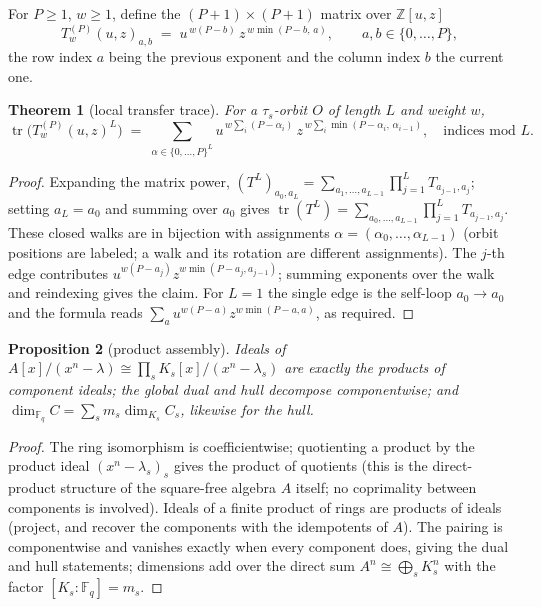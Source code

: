\documentclass[11pt]{article}
\newtheorem{theorem}{Theorem}[section]
\newtheorem{proposition}[theorem]{Proposition}
\theoremstyle{definition}
\theoremstyle{remark}
\newcommand{\Fq}{\mathbb{F}_q}
\newcommand{\Z}{\mathbb{Z}}
\newcommand{\tr}{\operatorname{tr}}
\begin{document}
For \(P \ge 1\), \(w \ge 1\), define the \((P{+}1)\times(P{+}1)\) matrix
over \(\Z[u,z]\)
\[
T^{(P)}_w(u,z)_{a,b} \;=\; u^{\,w(P-b)}\, z^{\,w \min(P-b,\, a)},
\qquad a, b \in \{0,\dots,P\},
\]
the row index \(a\) being the previous exponent and the column index
\(b\) the current one.

\begin{theorem}[local transfer trace]\label{thm:T5}
For a \(\tau_s\)-orbit \(O\) of length \(L\) and weight \(w\),
\[
\tr\!\big(T^{(P)}_w(u,z)^L\big)
\;=\; \sum_{\alpha \in \{0,\dots,P\}^L}
u^{\,w \sum_i (P-\alpha_i)}\,
z^{\,w \sum_i \min(P-\alpha_i,\, \alpha_{i-1})},
\quad \text{indices mod } L.
\]
\end{theorem}

\begin{proof}
Expanding the matrix power,
\((T^L)_{a_0,a_L} = \sum_{a_1,\dots,a_{L-1}} \prod_{j=1}^{L} T_{a_{j-1},a_j}\);
setting \(a_L = a_0\) and summing over \(a_0\) gives
\(\tr(T^L) = \sum_{a_0,\dots,a_{L-1}} \prod_{j=1}^{L} T_{a_{j-1},a_j}\).
These closed walks are in bijection with assignments
\(\alpha = (\alpha_0,\dots,\alpha_{L-1})\) (orbit positions are labeled;
a walk and its rotation are different assignments). The \(j\)-th edge
contributes \(u^{w(P-a_j)} z^{w\min(P-a_j, a_{j-1})}\); summing exponents
over the walk and reindexing gives the claim. For \(L=1\) the single edge
is the self-loop \(a_0 \to a_0\) and the formula reads
\(\sum_a u^{w(P-a)} z^{w\min(P-a,a)}\), as required.
\end{proof}

\begin{proposition}[product assembly]\label{prop:assembly}
Ideals of \(A[x]/(x^n-\lambda) \cong \prod_s K_s[x]/(x^n-\lambda_s)\) are
exactly the products of component ideals; the global dual and hull
decompose componentwise; and
\(\dim_{\Fq} C = \sum_s m_s \dim_{K_s} C_s\), likewise for the hull.
\end{proposition}

\begin{proof}
The ring isomorphism is coefficientwise; quotienting a product by the
product ideal \((x^n-\lambda_s)_s\) gives the product of quotients (this
is the direct-product structure of the square-free algebra \(A\) itself;
no coprimality between components is involved). Ideals of a finite
product of rings are products of ideals (project, and recover the
components with the idempotents of \(A\)). The pairing is componentwise
and vanishes exactly when every component does, giving the dual and hull
statements; dimensions add over the direct sum \(A^n \cong \bigoplus_s
K_s^n\) with the factor \([K_s:\Fq] = m_s\).
\end{proof}
\end{document}
